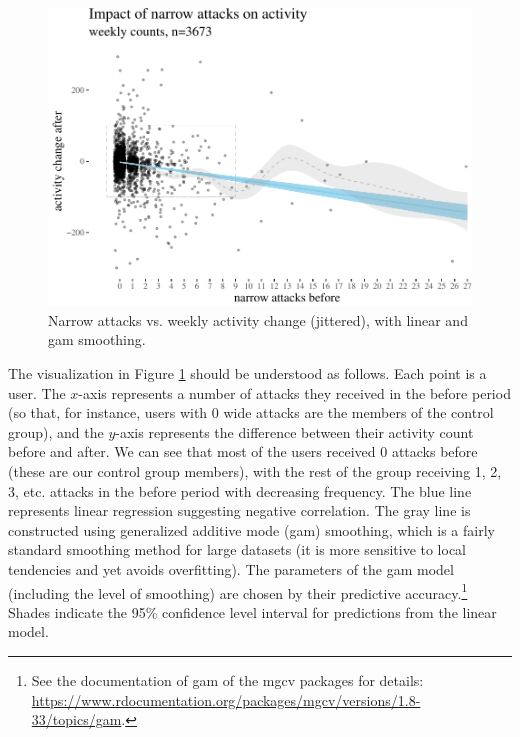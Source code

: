 \documentclass[
  10pt,
  dvipsnames]{scrartcl}
\begin{document}
\footnotesize

\normalsize

\begin{figure}

\begin{center}\includegraphics[width=0.85\linewidth]{quittingShortAbridgedRevisions3_files/figure-latex/unnamed-chunk-3-1} \end{center}
\caption{Narrow attacks vs. weekly activity change (jittered), with  linear and gam smoothing.}
\label{fig:highPlots}
\end{figure}

The visualization in Figure \ref{fig:highPlots} should be understood as
follows. Each point is a user. The \(x\)-axis represents a number of
attacks they received in the \textsf{before} period (so that, for
instance, users with 0 wide attacks are the members of the control
group), and the \(y\)-axis represents the difference between their
activity count \textsf{before} and \textsf{after}. We can see that most
of the users received 0 attacks before (these are our control group
members), with the rest of the group receiving 1, 2, 3, etc. attacks in
the \textsf{before} period with decreasing frequency. The blue line
represents linear regression suggesting negative correlation. The gray
line is constructed using generalized additive mode (gam) smoothing,
which is a fairly standard smoothing method for large datasets (it is
more sensitive to local tendencies and yet avoids overfitting). The
parameters of the gam model (including the level of smoothing) are
chosen by their predictive
accuracy.\footnote{See  the documentation of \textsf{gam} of the \textsf{mgcv} packages for details: \url{https://www.rdocumentation.org/packages/mgcv/versions/1.8-33/topics/gam}.}
Shades indicate the 95\% confidence level interval for predictions from
the linear model.
\end{document}

